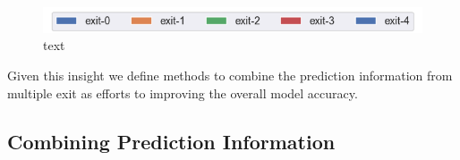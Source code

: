 \begin{figure}
	\captionsetup[subfigure]{justification=centering}
	\centering
	\includegraphics[width=.7\linewidth]{figures/edge/exit0-4_legend}
	\hfill
	\hfill
	\caption[short text]{text}
	\label{fig:exit-highscore}
\end{figure}


Given this insight we define methods to combine the prediction information from multiple exit as efforts to improving the overall model accuracy. 

\subsection{Combining Prediction Information}


